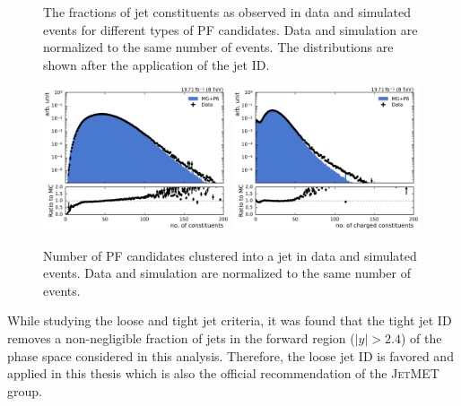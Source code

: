 \begin{figure}[htbp]
    \caption[PF candidate fractions in jets]{The fractions of jet constituents as
            observed in data and simulated events for different types of PF candidates.
            Data and simulation are normalized to the same number of events. The
            distributions are shown after the application of the jet ID.}
    \label{fig:jet_constituents_fractions}
\end{figure}

\begin{figure}[htbp]
    \centering
    \includegraphics[width=0.49\textwidth]{figures/measurement/jet_constituent_nConstituents.pdf}\hfill
    \includegraphics[width=0.49\textwidth]{figures/measurement/jet_constituent_nCharged.pdf}
    \caption[Number of particle candidates in jets]{Number of PF candidates
             clustered into a jet in data and simulated events. Data and simulation are
             normalized to the same number of events.}
    \label{fig:jet_constituents_counts}
\end{figure}

While studying the loose and tight jet criteria, it was found that the tight jet
ID removes a non-negligible fraction of jets in the forward region ($|y| > 2.4$) of the
phase space considered in this analysis. Therefore, the loose jet ID is favored
and applied in this thesis which is also the official recommendation of the
\textsc{JetMET} group.

